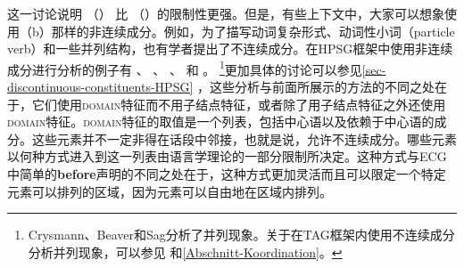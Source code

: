 这一讨论说明 （） 比 （）的限制性更强。但是，有些上下文中，大家可以想象使用（b）那样的非连续成分。例如，为了描写动词复杂形式、动词性小词（particle verb）和一些并列结构，也有学者提出了不连续成分\citep{Wells47a}。在HPSG\indexhpsg 框架中使用非连续成分进行分析的例子有 、 、 、 和 。 \footnote{%
Crysmann、Beaver和Sag分析了并列现象。关于在TAG\indextag 框架内使用不连续成分分析并列现象，可以参见 和\ref{Abschnitt-Koordination}。%
	}更加具体的讨论可以参见\ref{sec-discontinuous-constituents-HPSG} ，这些分析与前面所展示的方法的不同之处在于，它们使用\textsc{domain}特征而不用子结点特征，或者除了用子结点特征之外还使用\textsc{domain}特征。\textsc{domain}特征的取值是一个列表，包括中心语以及依赖于中心语的成分。这些元素并不一定非得在话段中邻接，也就是说，允许不连续成分。哪些元素以何种方式进入到这一列表由语言学理论的一部分限制所决定。这种方式与ECG中简单的\textbf{before}声明的不同之处在于，这种方式更加灵活而且可以限定一个特定元素可以排列的区域，因为元素可以自由地在区域内排列。

